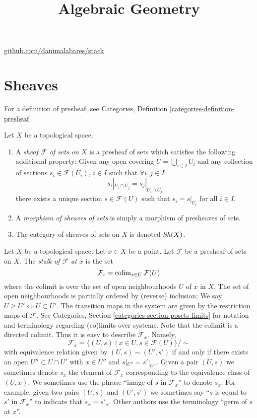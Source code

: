 



\title{Algebraic Geometry}
\maketitle

\label{section-phantom}
\hfill
\href{http://github.com/danimalabares/stack}{github.com/danimalabares/stack}

\tableofcontents

\section{Sheaves}
\label{section-sheaves}

For a definition of presheaf,
see Categories, Definition \ref{categories-definition-presheaf}.

\begin{definition}
\label{definition-sheaf}
Let $X$ be a topological space.
\begin{enumerate}
\item A {\it sheaf $\mathcal{F}$ of sets on $X$} is a presheaf
of sets which satisfies the following additional property: Given
any open covering $U = \bigcup_{i \in I} U_i$ and any collection
of sections $s_i \in \mathcal{F}(U_i)$, $i \in I$ such that
$\forall i, j\in I$
$$
s_i|_{U_i \cap U_j} = s_j|_{U_i \cap U_j}
$$
there exists a unique section $s \in \mathcal{F}(U)$ such that
$s_i = s|_{U_i}$ for all $i \in I$.
\item A {\it morphism of sheaves of sets} is simply a
morphism of presheaves of sets.
\item The category of sheaves of sets on $X$ is denoted
$\mathop{\mathit{Sh}}\nolimits(X)$.
\end{enumerate}
\end{definition}


\medskip\noindent
Let $X$ be a topological space. Let $x \in X$ be a point.
Let $\mathcal{F}$ be a presheaf of sets on $X$.
The {\it stalk of $\mathcal{F}$ at $x$} is the set
$$
\mathcal{F}_x
=
\mathop{\mathrm{colim}}\nolimits_{x\in U} \mathcal{F}(U)
$$
where the colimit is over the set of open neighbourhoods
$U$ of $x$ in $X$. The set of open neighbourhoods is
partially ordered by (reverse) inclusion:
We say $U \geq U' \Leftrightarrow U \subset U'$.
The transition maps in the system are
given by the restriction maps of $\mathcal{F}$.
See Categories, Section \ref{categories-section-posets-limits}
for notation and terminology regarding (co)limits over systems.
Note that the colimit is a directed colimit.
Thus it is easy to describe $\mathcal{F}_x$. Namely,
$$
\mathcal{F}_x
=
\{
(U, s)
\mid
x\in U, s\in \mathcal{F}(U)
\}/\sim
$$
with equivalence relation given by $(U, s) \sim (U', s')$ if and only if
there exists an open $U'' \subset U \cap U'$ with $x \in U''$ and
$s|_{U''} = s'|_{U''}$. Given a pair $(U, s)$ we sometimes denote
$s_x$ the element of $\mathcal{F}_x$ corresponding to the equivalence
class of $(U, x)$. We sometimes use the phrase
``image of $s$ in $\mathcal{F}_x$'' to denote $s_x$.
For example, given two pairs $(U, s)$ and $(U', s')$ we sometimes
say ``$s$ is equal to $s'$ in $\mathcal{F}_x$'' to indicate
that $s_x = s'_x$. Other authors use the terminology
``germ of $s$ at $x$''.

